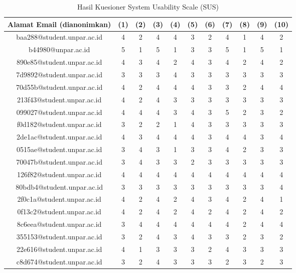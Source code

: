 \begin{longtable}{|c|c|c|c|c|c|c|c|c|c|c|}
	\caption{Hasil Kuesioner System Usability Scale (SUS)} 
	\label{table:hasil-kuesioner-sus} \\
\hline
\textbf{Alamat Email (dianonimkan)} & \textbf{(1)} & \textbf{(2)} & \textbf{(3)}  & \textbf{(4)} & \textbf{(5)} & \textbf{(6)} & \textbf{(7)} & \textbf{(8)} & \textbf{(9)} & \textbf{(10)} \\
\hline	baa288@student.unpar.ac.id	&	4	&	2	&	4	&	4	&	3	&	2	&	4	&	1	&	4	&	2	\\
\hline	b44980@unpar.ac.id	&	5	&	1	&	5	&	1	&	3	&	3	&	5	&	1	&	5	&	1	\\
\hline	890e85@student.unpar.ac.id	&	4	&	3	&	4	&	2	&	4	&	3	&	4	&	2	&	4	&	2	\\
\hline	7d9892@student.unpar.ac.id	&	3	&	3	&	3	&	4	&	3	&	3	&	3	&	3	&	3	&	3	\\
\hline	70d55b@student.unpar.ac.id	&	4	&	2	&	4	&	4	&	4	&	3	&	3	&	2	&	4	&	4	\\
\hline	213f43@student.unpar.ac.id	&	4	&	2	&	4	&	3	&	3	&	3	&	3	&	3	&	3	&	3	\\
\hline	099027@student.unpar.ac.id	&	4	&	4	&	4	&	3	&	4	&	3	&	5	&	2	&	3	&	2	\\
\hline	f0d182@student.unpar.ac.id	&	3	&	2	&	2	&	1	&	4	&	3	&	3	&	3	&	3	&	3	\\
\hline	2de1ac@student.unpar.ac.id	&	4	&	3	&	4	&	4	&	4	&	3	&	4	&	4	&	3	&	4	\\
\hline	0515ae@student.unpar.ac.id	&	3	&	4	&	3	&	1	&	3	&	3	&	4	&	2	&	3	&	3	\\
\hline	70047b@student.unpar.ac.id	&	3	&	4	&	3	&	3	&	2	&	3	&	3	&	3	&	3	&	3	\\
\hline	126f82@student.unpar.ac.id	&	4	&	4	&	4	&	4	&	4	&	4	&	4	&	4	&	4	&	4	\\
\hline	80bdb4@student.unpar.ac.id	&	3	&	3	&	3	&	3	&	3	&	3	&	3	&	3	&	3	&	4	\\
\hline	2f0c1a@student.unpar.ac.id	&	4	&	2	&	4	&	2	&	4	&	3	&	4	&	2	&	4	&	1	\\
\hline	0f13c2@student.unpar.ac.id	&	4	&	2	&	4	&	2	&	4	&	2	&	4	&	2	&	4	&	2	\\
\hline	8c6eea@student.unpar.ac.id	&	3	&	4	&	4	&	4	&	4	&	4	&	4	&	2	&	4	&	4	\\
\hline	355153@student.unpar.ac.id	&	3	&	2	&	4	&	3	&	4	&	3	&	3	&	2	&	3	&	2	\\
\hline	22e616@student.unpar.ac.id	&	4	&	1	&	3	&	3	&	3	&	2	&	4	&	3	&	3	&	3	\\
\hline	c8d674@student.unpar.ac.id	&	3	&	2	&	4	&	3	&	3	&	3	&	2	&	3	&	2	&	3	\\

\end{longtable}
